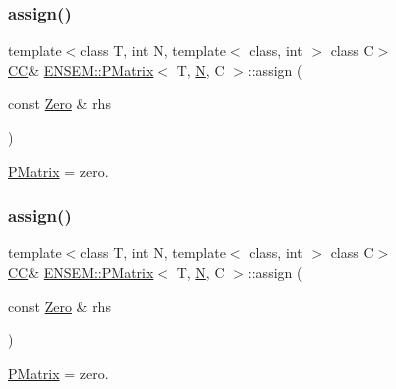 \subsubsection{\texorpdfstring{assign()}{assign()}\hspace{0.1cm}{\footnotesize\ttfamily [1/6]}}
{\footnotesize\ttfamily template$<$class T, int N, template$<$ class, int $>$ class C$>$ \\
\mbox{\hyperlink{classENSEM_1_1PMatrix_a744bac549029029effe32dc1705660ec}{CC}}\& \mbox{\hyperlink{classENSEM_1_1PMatrix}{E\+N\+S\+E\+M\+::\+P\+Matrix}}$<$ T, \mbox{\hyperlink{operator__name__util_8cc_a7722c8ecbb62d99aee7ce68b1752f337}{N}}, C $>$\+::assign (\begin{DoxyParamCaption}\item[{const \mbox{\hyperlink{structENSEM_1_1Zero}{Zero}} \&}]{rhs }\end{DoxyParamCaption})\hspace{0.3cm}{\ttfamily [inline]}}



\mbox{\hyperlink{classENSEM_1_1PMatrix}{P\+Matrix}} = zero. 

\mbox{\label{classENSEM_1_1PMatrix_a4d8aeb469d2295dc8c555a0180ab0613}} 
\subsubsection{\texorpdfstring{assign()}{assign()}\hspace{0.1cm}{\footnotesize\ttfamily [2/6]}}
{\footnotesize\ttfamily template$<$class T, int N, template$<$ class, int $>$ class C$>$ \\
\mbox{\hyperlink{classENSEM_1_1PMatrix_a744bac549029029effe32dc1705660ec}{CC}}\& \mbox{\hyperlink{classENSEM_1_1PMatrix}{E\+N\+S\+E\+M\+::\+P\+Matrix}}$<$ T, \mbox{\hyperlink{operator__name__util_8cc_a7722c8ecbb62d99aee7ce68b1752f337}{N}}, C $>$\+::assign (\begin{DoxyParamCaption}\item[{const \mbox{\hyperlink{structENSEM_1_1Zero}{Zero}} \&}]{rhs }\end{DoxyParamCaption})\hspace{0.3cm}{\ttfamily [inline]}}



\mbox{\hyperlink{classENSEM_1_1PMatrix}{P\+Matrix}} = zero. 

